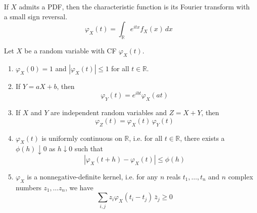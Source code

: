     If $X$ admits a PDF, then the characteristic function is its Fourier transform with a small sign reversal. 
    \begin{equation}
      \varphi_X (t) = \int_\mathbb{R} e^{i t x} f_X (x)\,dx
    \end{equation}

    \begin{theorem}[Properties of CF]
      Let $X$ be a random variable with CF $\varphi_X (t)$. 
      \begin{enumerate}
        \item $\varphi_X (0) = 1$  and $|\varphi_X (t)| \leq 1$ for all $t \in \mathbb{R}$. 
        \item If $Y = a X + b$, then 
        \begin{equation}
          \varphi_Y (t) = e^{i b t} \varphi_X (a t)
        \end{equation}
        \item If $X$ and $Y$ are independent random variables and $Z = X + Y$, then 
        \begin{equation}
          \varphi_Z (t) = \varphi_X (t) \, \varphi_Y (t)
        \end{equation}
        \item $\varphi_X (t)$ is uniformly continuous on $\mathbb{R}$, i.e. for all $t \in \mathbb{R}$, there exists a $\phi(h) \downarrow 0$ as $h \downarrow 0$ such that 
        \begin{equation}
          |\varphi_X (t + h) - \varphi_X (t)| \leq \phi(h)
        \end{equation}
        \item $\varphi_X$ is a nonnegative-definite kernel, i.e. for any $n$ reals $t_1, \ldots, t_n$ and $n$ complex numbers $z_1, \ldots z_n$, we have 
        \begin{equation}
          \sum_{i, j} z_i \varphi_X (t_i - t_j) \, \bar{z}_j \geq 0
        \end{equation}
      \end{enumerate}
    \end{theorem}
